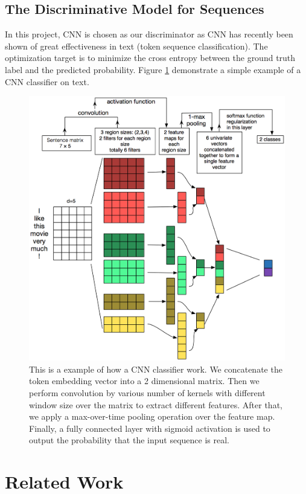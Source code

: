 \documentclass[conference]{IEEEtran}
\begin{document}
\subsection{The Discriminative Model for Sequences}

In this project, CNN is chosen as our discriminator as CNN has recently been shown of great effectiveness in text (token sequence classification). The optimization target is to minimize the cross entropy between the ground truth label and the predicted probability. Figure \ref{fig:cnn} demonstrate a simple example of a CNN classifier on text. 

\begin{figure}
	\centering
	\includegraphics[width=\columnwidth]{cnn.png}
	\caption{This is a example of how a CNN classifier work. We concatenate the token embedding vector into a 2 dimensional matrix. Then we perform convolution by various number of kernels with different window size over the matrix to extract different features. After that, we apply a max-over-time pooling operation over the feature map. Finally, a fully connected layer with sigmoid activation is used to output the probability that the input sequence is real.}	
	\label{fig:cnn}
\end{figure}


\section{Related Work}
\end{document}
